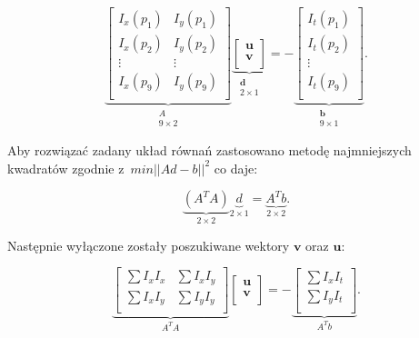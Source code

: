         \begin{equation}
          \underbrace{
            \begin{bmatrix}
              I_{x}(p_{1}) & I_{y}(p_{1}) \\
              I_{x}(p_{2}) & I_{y}(p_{2}) \\
              \vdots       & \vdots       \\
              I_{x}(p_{9}) & I_{y}(p_{9}) \\
            \end{bmatrix}}_{\substack{A\\9\times2}}
          \underbrace{
            \begin{bmatrix}
              \mathbf{u} \\
              \mathbf{v} \\
            \end{bmatrix}}_{\substack{\mathbf{d}\\2\times1}} =
          -\underbrace{
            \begin{bmatrix}
              I_{t}(p_{1}) \\
              I_{t}(p_{2}) \\
              \vdots       \\
              I_{t}(p_{9}) \\
            \end{bmatrix}}_{\substack{\mathbf{b}\\9\times1}}.
        \end{equation}

      Aby rozwiązać zadany układ równań zastosowano metodę najmniejszych kwadratów zgodnie z~$min||Ad - b||^{2}$ co daje:

        \begin{equation}
          \underbrace{(A^{T}A)}_{2\times2} \underbrace{d}_{2\times1} = \underbrace{A^{T}b}_{2\times2}.
        \end{equation}

      Następnie wyłączone zostały poszukiwane wektory $\mathbf{v}$ oraz $\mathbf{u}$:

        \begin{equation}
          \underbrace{
            \begin{bmatrix}
              \sum I_{x} I_{x} & \sum I_{x} I_{y} \\
              \sum I_{x} I_{y} & \sum I_{y} I_{y} \\
            \end{bmatrix}
          }_{A^{T}A}
          \begin{bmatrix}
            \mathbf{u} \\
            \mathbf{v} \\
          \end{bmatrix} =
          -\underbrace{
            \begin{bmatrix}
              \sum I_{x} I_{t} \\
              \sum I_{y} I_{t} \\
            \end{bmatrix}
          }_{A^{T}b}.
        \end{equation}

